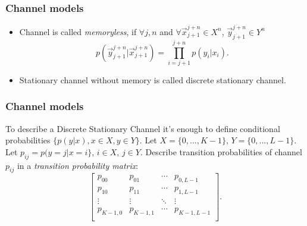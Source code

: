 \documentclass[14pt]{beamer}
\begin{document}
\begin{frame}
\frametitle{Channel models}
\begin{itemize}

\item
Channel is called \textit{memoryless}, if $\forall j,n $ and $\forall {\vec x}_{j + 1}^{j + n} \in X^n$, ${\vec y}_{j + 1}^{j
+ n} \in Y^n$
\[
p({\vec y}_{j + 1}^{j + n} \vert {\vec x}_{j + 1}^{j + n} ) =
\prod\limits_{i = j + 1}^{j + n} {p(y_i \vert x_i )} .
\]


\pause \item
Stationary channel without memory is called discrete stationary channel.

\end{itemize}
\end{frame}


\begin{frame}
\frametitle{Channel models}
\begin{itemize}
To describe a Discrete Stationary Channel it's enough to define conditional probabilities $\{p(y\vert x),x \in X,y \in Y\}$. Let $X = \{0,...,K - 1\}$, $Y = \{0,...,L - 1\}$. Let $p_{ij} = p(y = j\vert x = i\}$, $i \in X$, $j \in Y$.
Describe transition probabilities of channel $p_{ij} $ in a \textit{transition probability matrix}:
\[
\left[
  \begin{array}{cccc}
    p_{00} & p_{01} & \cdots & p_{0,L - 1} \\
    p_{10} & p_{11} & \cdots & p_{1,L - 1} \\
    \vdots & \vdots & \ddots & \vdots \\
    p_{K - 1,0} & p_{K - 1,1} & \cdots & p_{K - 1,L - 1} \\
  \end{array}
\right].
\]

\end{itemize}
\end{frame}
\end{document}
